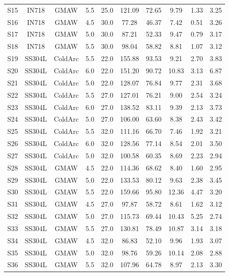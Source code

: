 \documentclass[12pt,a4paper,oneside]{report}
\begin{document}
\begin{table}[htbp]
\begin{tabular}{@{}cccccccccc@{}}
S15 & IN718 & GMAW    & 5.5 & 25.0 & 121.09 & 72.65 & 9.79 & 1.33 & 3.25\\
S16 & IN718 & GMAW    & 4.5 & 30.0 & 77.28  & 46.37 & 7.42 & 0.51 & 3.26\\
S17 & IN718 & GMAW    & 5.0 & 30.0 & 87.21  & 52.33 & 9.47 & 0.79 & 3.17\\
S18 & IN718 & GMAW    & 5.5 & 30.0 & 98.04  & 58.82 & 8.81 & 1.07 & 3.12\\
S19 & SS304L& ColdArc & 5.5 & 22.0 & 155.88 & 93.53 & 9.21 & 2.70 & 3.83\\
S20 & SS304L& ColdArc & 6.0 & 22.0 & 151.20 & 90.72 & 10.83 & 3.13 & 6.87\\
S21 & SS304L& ColdArc & 5.0 & 22.0 & 128.07 & 76.84 & 9.77 & 2.31 & 3.68\\
S22 & SS304L& ColdArc & 5.5 & 27.0 & 127.01 & 76.21 & 9.00 & 2.54 & 3.24\\
S23 & SS304L& ColdArc & 6.0 & 27.0 & 138.52 & 83.11 & 9.39 & 2.13 & 3.73\\
S24 & SS304L& ColdArc & 5.0 & 27.0 & 106.00 & 63.60 & 8.38 & 2.43 & 3.42\\
S25 & SS304L& ColdArc & 5.5 & 32.0 & 111.16 & 66.70 & 7.46 & 1.92 & 3.21\\
S26 & SS304L& ColdArc & 6.0 & 32.0 & 128.56 & 77.14 & 8.54 & 2.01 & 3.50\\
S27 & SS304L& ColdArc & 5.0 & 32.0 & 100.58 & 60.35 & 8.69 & 2.23 & 2.94\\
S28 & SS304L& GMAW    & 4.5 & 22.0 & 114.36 & 68.62 & 8.40 & 1.60 & 2.95\\
S29 & SS304L& GMAW    & 5.0 & 22.0 & 133.53 & 80.12 & 9.63 & 2.38 & 3.45\\
S30 & SS304L& GMAW    & 5.5 & 22.0 & 159.66 & 95.80 & 12.36 & 4.47 & 3.20\\
S31 & SS304L& GMAW    & 4.5 & 27.0 & 97.87  & 58.72 & 8.61 & 1.62 & 3.12\\
S32 & SS304L& GMAW    & 5.0 & 27.0 & 115.73 & 69.44 & 10.43 & 5.25 & 2.74\\
S33 & SS304L& GMAW    & 5.5 & 27.0 & 130.81 & 78.49 & 10.87 & 3.14 & 3.18\\
S34 & SS304L& GMAW    & 4.5 & 32.0 & 86.83  & 52.10 & 9.96 & 1.93 & 3.07\\
S35 & SS304L& GMAW    & 5.0 & 32.0 & 98.76  & 59.26 & 10.14 & 2.08 & 2.88\\
S36 & SS304L& GMAW    & 5.5 & 32.0 & 107.96 & 64.78 & 8.97 & 2.13 & 3.30\\
\bottomrule
\end{tabular}
\end{table}
\end{document}
